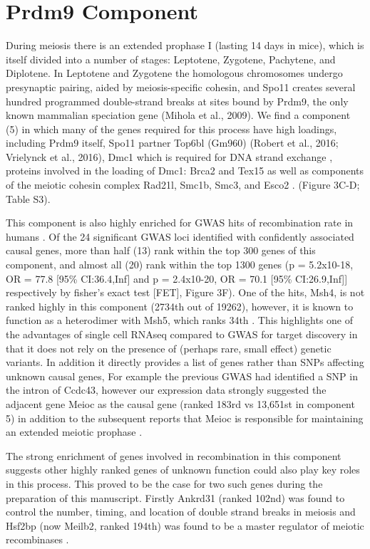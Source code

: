 \section{Prdm9 Component}

During meiosis there is an extended prophase I (lasting 14 days in mice), which is itself divided into a number of stages: Leptotene, Zygotene, Pachytene, and Diplotene. In Leptotene and Zygotene the homologous chromosomes undergo presynaptic pairing, aided by meiosis-specific cohesin, and Spo11 creates several hundred programmed double-strand breaks at sites bound by Prdm9, the only known mammalian speciation gene (Mihola et al., 2009). We find a component (5) in which many of the genes required for this process have high loadings, including Prdm9 itself, Spo11 partner Top6bl (Gm960) (Robert et al., 2016; Vrielynck et al., 2016), Dmc1 which is required for DNA strand exchange \cite{Brown2014-wg}, proteins involved in the loading of Dmc1: Brca2 \cite{Martinez2016-qj} and Tex15 \cite{Yang2008-nj} as well as  components of the meiotic cohesin complex Rad21l, Smc1b, Smc3, and Esco2 \cite{Rankin2015-jz}. (Figure 3C-D; Table S3).

This component is also highly enriched for GWAS hits of recombination rate in humans \cite{Halldorsson2019-vk}. Of the 24 significant GWAS loci identified with confidently associated causal genes, more than half (13) rank within the top 300 genes of this component, and almost all (20) rank within the top 1300 genes (p = 5.2x10-18, OR = 77.8 [95\% CI:36.4,Inf] and p = 2.4x10-20, OR = 70.1 [95\% CI:26.9,Inf]] respectively by fisher's exact test [FET], Figure 3F). One of the hits, Msh4, is not ranked highly in this component (2734th out of 19262), however, it is known to function as a heterodimer with Msh5, which ranks 34th \cite{Rakshambikai2013-qi}. This highlights one of the advantages of single cell RNAseq compared to GWAS for target discovery in that it does not rely on the presence of (perhaps rare, small effect) genetic variants. In addition it directly provides a list of genes rather than SNPs affecting unknown causal genes, For example the previous GWAS had identified a SNP in the intron of Ccdc43, however our expression data strongly suggested the adjacent gene Meioc as the causal gene (ranked 183rd vs 13,651st in component 5) in addition to the subsequent reports that Meioc is responsible for maintaining an extended meiotic prophase \cite{Abby2016-kc, Kong2014-ae, Soh2017-vq}. 

The strong enrichment of genes involved in recombination in this component suggests other highly ranked genes of unknown function could also play key roles in this process. This proved to be the case for two such genes during the preparation of this manuscript. Firstly Ankrd31 (ranked 102nd) was found to control the number, timing, and location of double strand breaks in meiosis \cite{Boekhout2018-wr, Papanikos2018-jp} and Hsf2bp (now Meilb2, ranked 194th) was found to be a master regulator of meiotic recombinases \cite{Zhang2019-fb}.

